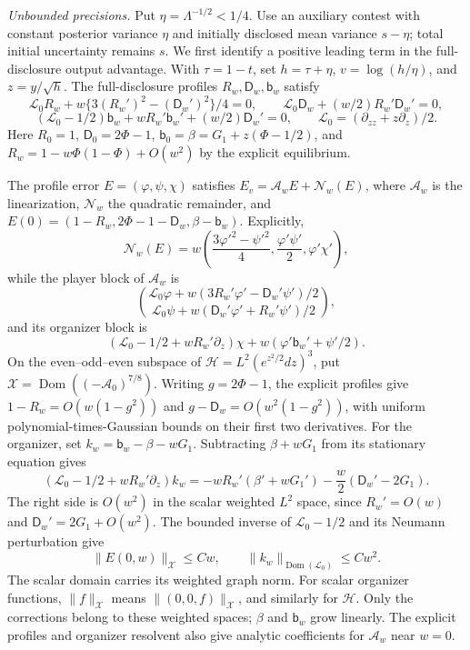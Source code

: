 \documentclass[mnsc]{informs3}
\begin{document}
\begin{APPENDICES}
{\emph{Unbounded precisions.}
Put $\eta=\Lambda^{-1/2}<1/4$.
Use an auxiliary contest with constant posterior variance $\eta$
and initially disclosed mean variance $s-\eta$; total initial
uncertainty remains $s$. We first identify a positive leading term
in the full-disclosure output advantage. With $\tau=1-t$, set
$h=\tau+\eta$, $v=\log(h/\eta)$, and $z=y/\sqrt h$.
The full-disclosure profiles $R_w,\mathsf D_w,\mathsf b_w$ satisfy
\[
\mathscr L_0R_w+w\{3(R_w')^2-(\mathsf D_w')^2\}/4=0,\qquad
\mathscr L_0\mathsf D_w+(w/2)R_w'\mathsf D_w'=0,
\]
\[
(\mathscr L_0-1/2)\mathsf b_w+wR_w'\mathsf b_w'+(w/2)\mathsf D_w'=0,
\qquad \mathscr L_0=(\partial_{zz}+z\partial_z)/2.
\]
Here $R_0=1$, $\mathsf D_0=2\Phi-1$, $\mathsf b_0=\beta=G_1+z(\Phi-1/2)$,
and $R_w=1-w\Phi(1-\Phi)+O(w^2)$ by the explicit equilibrium.

The profile error $E=(\varphi,\psi,\chi)$ satisfies
$E_v=\mathcal A_wE+\mathscr N_w(E)$, where $\mathcal A_w$ is the
linearization, $\mathscr N_w$ the quadratic remainder, and
$E(0)=(1-R_w,2\Phi-1-\mathsf D_w,\beta-\mathsf b_w)$.
Explicitly,
\[
\mathscr N_w(E)=w\left(
\frac{3\varphi'^2-\psi'^2}{4},\frac{\varphi'\psi'}2,\varphi'\chi'
\right),
\]
while the player block of $\mathcal A_w$ is
\[
\binom{\mathscr L_0\varphi+
w(3R_w'\varphi'-\mathsf D_w'\psi')/2}
{\mathscr L_0\psi+w(\mathsf D_w'\varphi'+R_w'\psi')/2},
\]
and its organizer block is
\[
(\mathscr L_0-1/2+wR_w'\partial_z)\chi
+w(\varphi'\mathsf b_w'+\psi'/2).
\]
On the even--odd--even subspace of
$\mathscr H=L^2(e^{z^2/2}dz)^3$, put $\mathscr X=\operatorname{Dom}((-\mathcal A_0)^{7/8})$.
Writing $g=2\Phi-1$, the explicit profiles give
$1-R_w=O(w(1-g^2))$ and $g-\mathsf D_w=O(w^2(1-g^2))$,
with uniform polynomial-times-Gaussian bounds on their first two derivatives.
For the organizer, set $k_w=\mathsf b_w-\beta-wG_1$.
Subtracting $\beta+wG_1$ from its stationary equation gives
\[
(\mathscr L_0-1/2+wR_w'\partial_z)k_w
=-wR_w'(\beta'+wG_1')-\frac w2(\mathsf D_w'-2G_1).
\]
The right side is $O(w^2)$ in the scalar weighted $L^2$ space, since
$R_w'=O(w)$ and $\mathsf D_w'=2G_1+O(w^2)$.
The bounded inverse of $\mathscr L_0-1/2$ and its Neumann perturbation give
\begin{equation}\label{eq-design-profile-initial-bound}
\|E(0,w)\|_{\mathscr X}\leq Cw,\qquad
\|k_w\|_{\operatorname{Dom}(\mathscr L_0)}\leq Cw^2.
\end{equation}
The scalar domain carries its weighted graph norm.
For scalar organizer functions, $\|f\|_{\mathscr X}$ means
$\|(0,0,f)\|_{\mathscr X}$, and similarly for $\mathscr H$.
Only the corrections belong to these weighted spaces; $\beta$ and
$\mathsf b_w$ grow linearly. The explicit profiles and organizer resolvent
also give analytic coefficients for $\mathcal A_w$ near $w=0$.

}
\end{APPENDICES}
\end{document}
